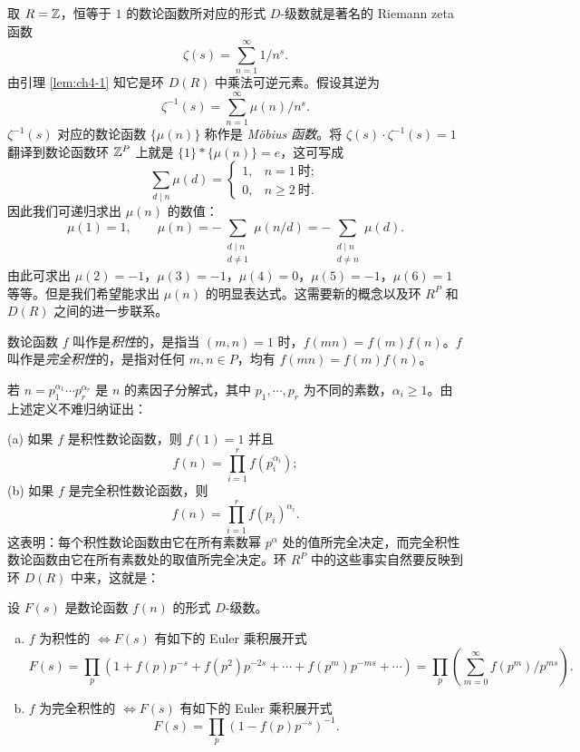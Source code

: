\begin{sloppypar}
取 $R=\mathbb{Z}$，恒等于 $1$ 的数论函数所对应的形式 $D$-级数就是著名的 Riemann zeta 函数
\[
  \zeta(s)=\sum_{n=1}^{\infty}1/n^s.
\]
由引理 \ref{lem:ch4-1} 知它是环 $D(R)$ 中乘法可逆元素。假设其逆为
\[
  \zeta^{-1}(s)=\sum_{n=1}^{\infty}\mu(n)/n^s.
\]
$\zeta^{-1}(s)$ 对应的数论函数 $\{\mu(n)\}$ 称作是 \emph{Möbius 函数}。将 $\zeta(s)\cdot\zeta^{-1}(s)=1$ 翻译到数论函数环 $\mathbb{Z}^P$ 上就是 $\{1\}*\{\mu(n)\}=e$，这可写成
\[
  \sum_{d\mid n}\mu(d)=\begin{cases}
    1, & n=1\ \text{时};\\
    0, & n\geqslant 2\ \text{时}.
  \end{cases}
\]
因此我们可递归求出 $\mu(n)$ 的数值：
\[
  \mu(1)=1,\qquad \mu(n)=-\sum_{\substack{d\mid n\\ d\neq 1}}\mu(n/d)=-\sum_{\substack{d\mid n\\ d\neq n}}\mu(d).
\]
由此可求出 $\mu(2)=-1$，$\mu(3)=-1$，$\mu(4)=0$，$\mu(5)=-1$，$\mu(6)=1$ 等等。但是我们希望能求出 $\mu(n)$ 的明显表达式。这需要新的概念以及环 $R^P$ 和 $D(R)$ 之间的进一步联系。
\end{sloppypar}

\begin{definition}\label{def:ch4-1}
数论函数 $f$ 叫作是\emph{积性}的，是指当 $(m,n)=1$ 时，$f(mn)=f(m)f(n)$。$f$ 叫作是\emph{完全积性}的，是指对任何 $m,n\in P$，均有 $f(mn)=f(m)f(n)$。
\end{definition}

若 $n=p_1^{\alpha_1}\cdots p_r^{\alpha_r}$ 是 $n$ 的素因子分解式，其中 $p_1,\cdots,p_r$ 为不同的素数，$\alpha_i\geqslant 1$。由上述定义不难归纳证出：

(a) 如果 $f$ 是积性数论函数，则 $f(1)=1$ 并且
\[
  f(n)=\prod_{i=1}^{r}f(p_i^{\alpha_i});
\]
(b) 如果 $f$ 是完全积性数论函数，则
\[
  f(n)=\prod_{i=1}^{r}f(p_i)^{\alpha_i}.
\]
这表明：每个积性数论函数由它在所有素数幂 $p^{\alpha}$ 处的值所完全决定，而完全积性数论函数由它在所有素数处的取值所完全决定。环 $R^P$ 中的这些事实自然要反映到环 $D(R)$ 中来，这就是：

\begin{lemma}\label{lem:ch4-2}
设 $F(s)$ 是数论函数 $f(n)$ 的形式 $D$-级数。
\begin{enumerate}[(a)]
  \item $f$ 为积性的 $\Leftrightarrow F(s)$ 有如下的 Euler 乘积展开式
  \[
    F(s)=\prod_p\left(1+f(p)p^{-s}+f(p^2)p^{-2s}+\cdots+f(p^m)p^{-ms}+\cdots\right)
    =\prod_p\left(\sum_{m=0}^{\infty}f(p^m)/p^{ms}\right).
  \]
  \item $f$ 为完全积性的 $\Leftrightarrow F(s)$ 有如下的 Euler 乘积展开式
  \[
    F(s)=\prod_p(1-f(p)p^{-s})^{-1}.
  \]
\end{enumerate}
\end{lemma}

